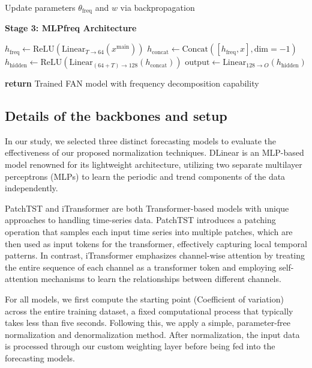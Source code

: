 \documentclass[sigconf,anonymous,review]{acmart}
\begin{document}
\begin{algorithm}[h]
{    Update parameters $\theta_{\text{freq}}$ and $w$ via backpropagation \;
  }
  
  \vspace{0.3cm}
  \textbf{Stage 3: MLPfreq Architecture}\;
  
  $h_{\text{freq}} \gets \text{ReLU}(\text{Linear}_{T \rightarrow 64}(x^{\text{main}}))$ \;
  $h_{\text{concat}} \gets \text{Concat}([h_{\text{freq}}, x], \text{dim}=-1)$ \;
  $h_{\text{hidden}} \gets \text{ReLU}(\text{Linear}_{(64+T) \rightarrow 128}(h_{\text{concat}}))$ \;
  $\text{output} \gets \text{Linear}_{128 \rightarrow O}(h_{\text{hidden}})$ \;
  
  \textbf{return} Trained FAN model with frequency decomposition capability \;
\end{algorithm}

\subsection{Details of the backbones and setup}
\label{appendix:exp_backbones_setup}

In our study, we selected three distinct forecasting models to evaluate the effectiveness of our proposed normalization techniques.
DLinear is an MLP-based model renowned for its lightweight architecture, utilizing two separate multilayer perceptrons (MLPs) to learn the periodic and trend components of the data independently.

PatchTST and iTransformer are both Transformer-based models with unique approaches to handling time-series data.
PatchTST introduces a patching operation that samples each input time series into multiple patches, which are then used as input tokens for the transformer, effectively capturing local temporal patterns.
In contrast, iTransformer emphasizes channel-wise attention by treating the entire sequence of each channel as a transformer token and employing self-attention mechanisms to learn the relationships between different channels. 

For all models, we first compute the starting point (Coefficient of variation) across the entire training dataset, a fixed computational process that typically takes less than five seconds. 
Following this, we apply a simple, parameter-free normalization and denormalization method. 
After normalization, the input data is processed through our custom weighting layer before being fed into the forecasting models. 
\end{document}
